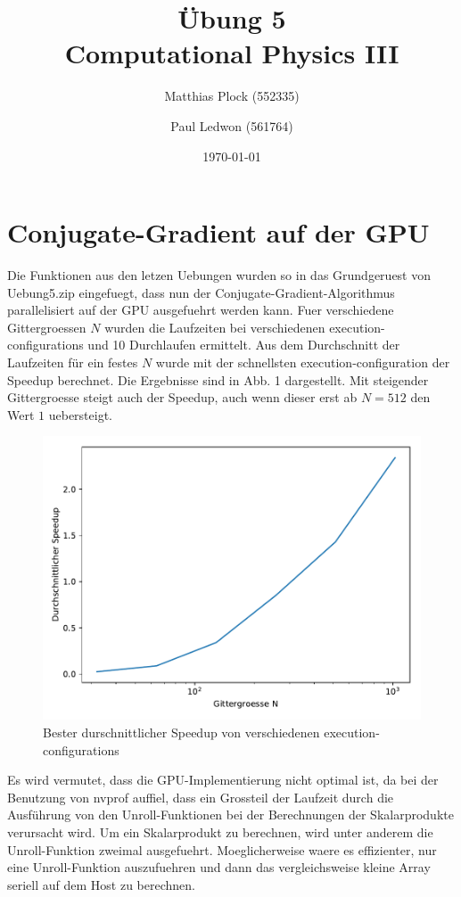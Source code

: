 \documentclass[10pt,a4paper]{article}
\title{Übung 5 \\Computational Physics III}
\author{Matthias Plock (552335) \and Paul Ledwon (561764)} %
\date{\today}
\begin{document}
\maketitle
\tableofcontents

\pagestyle{myheadings}                  %

\section{Conjugate-Gradient auf der GPU}

Die Funktionen aus den letzen Uebungen wurden so in das Grundgeruest von Uebung5.zip
eingefuegt, dass nun der Conjugate-Gradient-Algorithmus parallelisiert auf der GPU
ausgefuehrt werden kann. Fuer verschiedene Gittergroessen $N$ wurden die Laufzeiten
bei verschiedenen execution-configurations und 10 Durchlaufen ermittelt. Aus dem
Durchschnitt der Laufzeiten für ein festes $N$ wurde mit der schnellsten execution-configuration
der Speedup berechnet. Die Ergebnisse sind in Abb. 1 dargestellt. Mit steigender Gittergroesse
steigt auch der Speedup, auch wenn dieser erst ab $N=512$ den Wert $1$ uebersteigt.\\

\begin{figure}[H]
  \centering
  \includegraphics[width=\textwidth]{../figures/speedup.pdf}
  \caption{Bester durschnittlicher Speedup von verschiedenen execution-configurations}
\end{figure}


Es wird vermutet, dass die GPU-Implementierung nicht optimal ist, da bei der Benutzung von nvprof
auffiel, dass ein Grossteil der Laufzeit durch die Ausführung von den Unroll-Funktionen bei der Berechnungen
der Skalarprodukte verursacht wird. Um ein Skalarprodukt zu berechnen, wird unter anderem die Unroll-Funktion zweimal ausgefuehrt. Moeglicherweise
waere es effizienter, nur eine Unroll-Funktion auszufuehren und dann das vergleichsweise kleine Array seriell auf dem Host zu berechnen.
\end{document}
